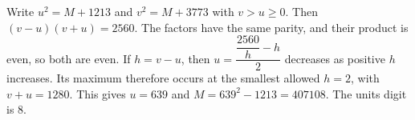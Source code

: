 Write $u^2=M+1213$ and $v^2=M+3773$ with $v>u\ge0$. Then $(v-u)(v+u)=2560$. The factors have the same parity, and their product is even, so both are even. If $h=v-u$, then $u=\dfrac{\dfrac{2560}{h}-h}{2}$ decreases as positive $h$ increases. Its maximum therefore occurs at the smallest allowed $h=2$, with $v+u=1280$. This gives $u=639$ and $M=639^2-1213=407108$. The units digit is $\boxed8$.
